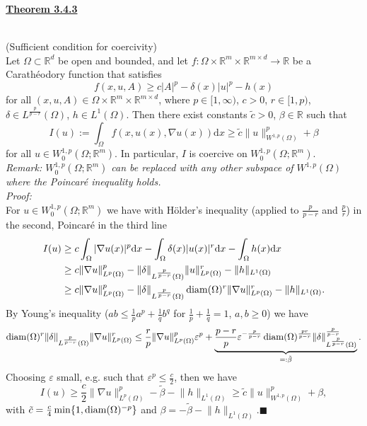\hypertarget{theorem_3_4_3}{\textbf{\underline{Theorem 3.4.3}}}\\
(Sufficient condition for coercivity)\\
Let $\Omega\subset\mathbb{R}^d$ be open and bounded, and let $f:\Omega\times\mathbb{R}^m\times\mathbb{R}^{m\times d}\longrightarrow\mathbb{R}$ be a Carath\'eodory function that satisfies
\[f(x,u,A)\geq c\lvert A\rvert^p-\delta(x)\lvert u\rvert^p-h(x)\]
for all $(x,u,A)\in\Omega\times\mathbb{R}^m\times\mathbb{R}^{m\times d}$, where $p\in[1,\infty)$, $c>0$, $r\in[1,p)$, $\delta\in L^{\frac{p}{p-r}}(\Omega)$, $h\in L^1(\Omega)$. Then there exist constants $\tilde{c}>0$, $\beta\in\mathbb{R}$ such that
\[I(u):=\int_\Omega{f(x,u(x),\nabla u(x))\mathrm{d}x}\geq\tilde{c}\lVert u\rVert_{W^{1,p}(\Omega)}^p+\beta\]
for all $u\in W_0^{1,p}(\Omega;\mathbb{R}^m)$. In particular, $I$ is coercive on $W_0^{1,p}(\Omega;\mathbb{R}^m)$.\\

\textit{Remark: $W_0^{1,p}(\Omega;\mathbb{R}^m)$ can be replaced with any other subspace of $W^{1,p}(\Omega)$ where the Poincar\'e inequality holds.}\\

\textit{Proof:}\\
For $u\in W_0^{1,p}(\Omega;\mathbb{R}^m)$ we have with H\"older's inequality (applied to $\frac{p}{p-r}$ and $\frac{p}{r}$) in the second, Poincar\'e in the third line
\begin{align*}
	I(u)&\geq c\int_\Omega{\lvert\nabla u(x)\vert^p\mathrm{d}x}-\int_\Omega{\delta(x)\lvert u(x)\rvert^r\mathrm{d}x}-\int_\Omega{h(x)\mathrm{d}x}\\
	&\geq c\lVert\nabla u\rVert_{L^p(\Omega)}^p-\lVert\delta\rVert_{L^{\frac{p}{p-r}}(\Omega)}\lVert u\rVert_{L^p(\Omega)}^r-\lVert h\rVert_{L^1(\Omega)}\\
	&\geq c\lVert\nabla u\rVert_{L^p(\Omega)}^p-\lVert\delta\rVert_{L^{\frac{p}{p-r}}(\Omega)}\operatorname{diam}\mathopen{}\left(\Omega\right)\mathclose{}^r\lVert\nabla u\rVert_{L^p(\Omega)}^r-\lVert h\rVert_{L^1(\Omega)}.
\end{align*}
By Young's inequality ($ab\leq\frac{1}{p}a^p+\frac{1}{q}b^q$ for $\frac{1}{p}+\frac{1}{q}=1$, $a,b\geq0$) we have
\[\operatorname{diam}\mathopen{}\left(\Omega\right)\mathclose{}^r\lVert\delta\rVert_{L^{\frac{p}{p-r}}(\Omega)}\lVert\nabla u\rVert_{L^p(\Omega)}^r\leq\frac{r}{p}\lVert\nabla u\rVert_{L^p(\Omega)}^p\varepsilon^p+\underbrace{\frac{p-r}{p}\varepsilon^{-\frac{p}{p-r}}\operatorname{diam}\mathopen{}\left(\Omega\right)\mathclose{}^{\frac{pr}{p-r}}\lVert\delta\rVert_{L^{\frac{p}{p-r}}(\Omega)}^{\frac{p}{p-r}}}_{=:\tilde{\beta}}.\]
Choosing $\varepsilon$ small, e.g. such that $\varepsilon^p\leq\frac{c}{2}$, then we have
\[I(u)\geq\frac{c}{2}\lVert\nabla u\rVert_{L^p(\Omega)}^p-\tilde{\beta}-\lVert h\rVert_{L^1(\Omega)}\geq\tilde{c}\lVert u\rVert_{W^{1,p}(\Omega)}^p+\beta,\]
with $\tilde{c}=\frac{c}{4}\min\{1,\operatorname{diam}\mathopen{}\left(\Omega\right)\mathclose{}^{-p}\}$ and $\beta=-\tilde{\beta}-\lVert h\rVert_{L^1(\Omega)}$.\hfill$\blacksquare$\\[11pt]

